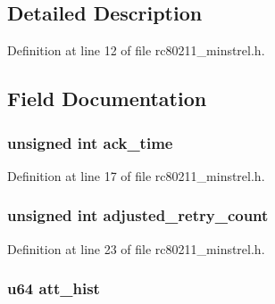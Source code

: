 \subsection{Detailed Description}


Definition at line 12 of file rc80211\-\_\-minstrel.\-h.



\subsection{Field Documentation}
\hypertarget{structminstrel__rate_a84cfe794c5114005b22f693b28183fcb}{
\subsubsection[{ack\-\_\-time}]{\setlength{\rightskip}{0pt plus 5cm}unsigned int ack\-\_\-time}}\label{structminstrel__rate_a84cfe794c5114005b22f693b28183fcb}


Definition at line 17 of file rc80211\-\_\-minstrel.\-h.

\hypertarget{structminstrel__rate_a2e1fba3f2815c73ff517aa5971460b1e}{
\subsubsection[{adjusted\-\_\-retry\-\_\-count}]{\setlength{\rightskip}{0pt plus 5cm}unsigned int adjusted\-\_\-retry\-\_\-count}}\label{structminstrel__rate_a2e1fba3f2815c73ff517aa5971460b1e}


Definition at line 23 of file rc80211\-\_\-minstrel.\-h.

\hypertarget{structminstrel__rate_ad1e0131b84d34b871828347daa221112}{
\subsubsection[{att\-\_\-hist}]{\setlength{\rightskip}{0pt plus 5cm}u64 att\-\_\-hist}}\label{structminstrel__rate_ad1e0131b84d34b871828347daa221112}



